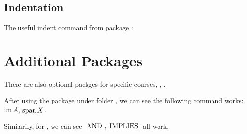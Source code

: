 \documentclass[12pt, sakura, night, 0.5in]{alittlebear}
\begin{document}
\subsection{Indentation}

The useful indent command from package :


\np
\section{Additional Packages}

There are also optional packges for specific courses, \eg, .

After using the  package under folder , we can see the following command works: $\operatorname{im} A$, $\operatorname{span} X$.

Similarily, for , we can see $\,\,\mathrm{AND}\,\,, \,\,\mathrm{IMPLIES}\,\,$ all work.
\end{document}
